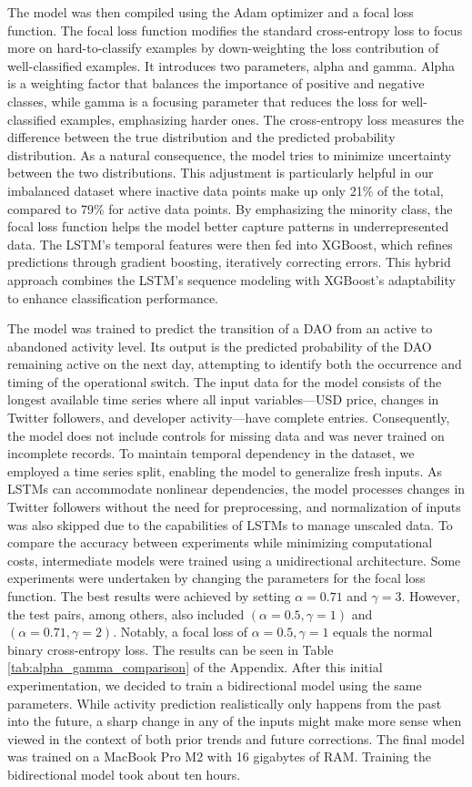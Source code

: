The model was then compiled using the Adam optimizer and a focal loss function. 
The focal loss function modifies the standard cross-entropy loss to focus more on hard-to-classify examples by down-weighting the loss contribution of well-classified examples. It introduces two parameters, alpha and gamma. Alpha is a weighting factor that balances the importance of positive and negative classes, while gamma is a focusing parameter that reduces the loss for well-classified examples, emphasizing harder ones. 
The cross-entropy loss measures the difference between the true distribution and the predicted probability distribution. As a natural consequence, the model tries to minimize uncertainty between the two distributions.
This adjustment is particularly helpful in our imbalanced dataset where inactive data points make up only 21\% of the total, compared to 79\% for active data points.
By emphasizing the minority class, the focal loss function helps the model better capture patterns in underrepresented data.
The LSTM's temporal features were then fed into XGBoost, which refines predictions through gradient boosting, iteratively correcting errors.
This hybrid approach combines the LSTM's sequence modeling with XGBoost's adaptability to enhance classification performance.

The model was trained to predict the transition of a DAO from an active to abandoned activity level. Its output is the predicted probability of the DAO remaining active on the next day, attempting to identify both the occurrence and timing of the operational switch.
The input data for the model consists of the longest available time series where all input variables—USD price, changes in Twitter followers, and developer activity—have complete entries. Consequently, the model does not include controls for missing data and was never trained on incomplete records. To maintain temporal dependency in the dataset, we employed a time series split, enabling the model to generalize fresh inputs.
As LSTMs can accommodate nonlinear dependencies, the model processes changes in Twitter followers without the need for preprocessing, and normalization of inputs was also skipped due to the capabilities of LSTMs to manage unscaled data.
To compare the accuracy between experiments while minimizing computational costs, intermediate models were trained using a unidirectional architecture. Some experiments were undertaken by changing the parameters for the focal loss function. The best results were achieved by setting $\alpha = 0.71$ and $\gamma = 3$. However, the test pairs, among others, also included $(\alpha = 0.5, \gamma = 1)$ and $(\alpha = 0.71, \gamma = 2)$. Notably, a focal loss of $\alpha = 0.5, \gamma = 1$ equals the normal binary cross-entropy loss. The results can be seen in Table \ref{tab:alpha_gamma_comparison} of the Appendix.
After this initial experimentation, we decided to train a bidirectional model using the same parameters. While activity prediction realistically only happens from the past into the future, a sharp change in any of the inputs might make more sense when viewed in the context of both prior trends and future corrections.
The final model was trained on a MacBook Pro M2 with 16 gigabytes of RAM. Training the bidirectional model took about ten hours.

